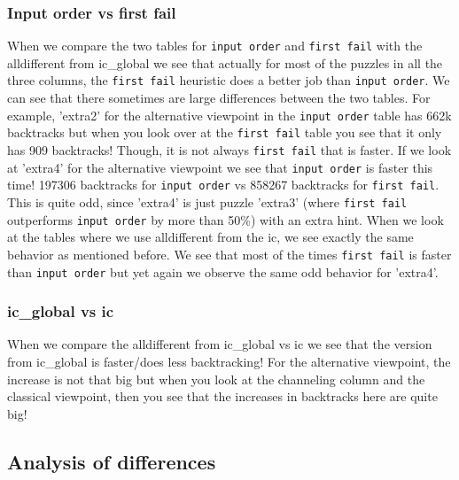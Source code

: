 \documentclass{report}
\begin{document}
\subsubsection{Input order vs first fail}
When we compare the two tables for \texttt{input order} and \texttt{first fail} with the alldifferent from ic\_global we see that actually for most of the puzzles in all the three columns, the \texttt{first fail} heuristic does a better job than \texttt{input order}. We can see that there sometimes are large differences between the two tables. For example, 'extra2' for the alternative viewpoint in the \texttt{input order} table has 662k backtracks but when you look over at the \texttt{first fail} table you see that it only has 909 backtracks! Though, it is not always \texttt{first fail} that is faster. If we look at 'extra4' for the alternative viewpoint we see that \texttt{input order} is faster this time! 197306 backtracks for \texttt{input order} vs 858267 backtracks for \texttt{first fail}. This is quite odd, since 'extra4' is just puzzle 'extra3' (where \texttt{first fail} outperforms \texttt{input order} by more than 50\%) with an extra hint.
\newline
\newline
When we look at the tables where we use alldifferent from the ic, we see exactly the same behavior as mentioned before. We see that most of the times \texttt{first fail} is faster than \texttt{input order} but yet again we observe the same odd behavior for 'extra4'.

\subsubsection{ic\_global vs ic}
When we compare the alldifferent from ic\_global vs ic we see that the version from ic\_global is faster/does less backtracking! For the alternative viewpoint, the increase is not that big but when you look at the channeling column and the classical viewpoint, then you see that the increases in backtracks here are quite big!

\subsection{Analysis of differences}
\end{document}
